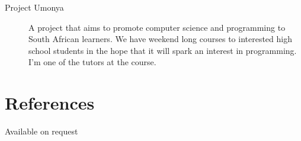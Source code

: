 \documentclass[margin,line,a4paper]{resume}
\begin{document}
\begin{resume}
\begin{description}
                \item [Project Umonya] A project that aims to promote computer science and programming
                to South African learners. We have weekend long courses to interested high school students
                in the hope that it will spark an interest in programming. I'm one of the tutors at the course.
            \end{description}

        \section{\mysidestyle References}
            Available on request
    \end{resume}
\end{document}

